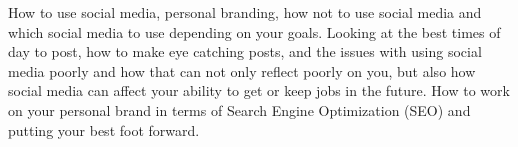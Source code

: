 {
{How to use social media, personal branding, how not to use social media and which social media to use depending on your goals. Looking at the best times of day to post, how to make eye catching posts, and the issues with using social media poorly and how that can not only reflect poorly on you, but also how social media can affect your ability to get or keep jobs in the future. How to work on your personal brand in terms of Search Engine Optimization (SEO) and putting your best foot forward. }



}
